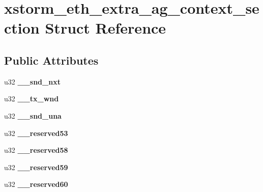 \hypertarget{structxstorm__eth__extra__ag__context__section}{
\section{xstorm\_\-eth\_\-extra\_\-ag\_\-context\_\-section Struct Reference}
\label{structxstorm__eth__extra__ag__context__section}
}
\subsection*{Public Attributes}
\begin{DoxyCompactItemize}
\item 
\hypertarget{structxstorm__eth__extra__ag__context__section_a23758415856c4a96114fd54cebeb6c03}{
u32 {\bfseries \_\-\_\-snd\_\-nxt}}
\label{structxstorm__eth__extra__ag__context__section_a23758415856c4a96114fd54cebeb6c03}

\item 
\hypertarget{structxstorm__eth__extra__ag__context__section_aa446dbf85c3e9340d5f7b6c2d716c24f}{
u32 {\bfseries \_\-\_\-tx\_\-wnd}}
\label{structxstorm__eth__extra__ag__context__section_aa446dbf85c3e9340d5f7b6c2d716c24f}

\item 
\hypertarget{structxstorm__eth__extra__ag__context__section_adbbbc039cc002cc3d3acb4dc955a78ce}{
u32 {\bfseries \_\-\_\-snd\_\-una}}
\label{structxstorm__eth__extra__ag__context__section_adbbbc039cc002cc3d3acb4dc955a78ce}

\item 
\hypertarget{structxstorm__eth__extra__ag__context__section_a65ef1bcdd3724f50ceaceab361eca348}{
u32 {\bfseries \_\-\_\-reserved53}}
\label{structxstorm__eth__extra__ag__context__section_a65ef1bcdd3724f50ceaceab361eca348}

\item 
\hypertarget{structxstorm__eth__extra__ag__context__section_a78b940c45897fa0a3355163c11149128}{
u32 {\bfseries \_\-\_\-reserved58}}
\label{structxstorm__eth__extra__ag__context__section_a78b940c45897fa0a3355163c11149128}

\item 
\hypertarget{structxstorm__eth__extra__ag__context__section_aa07fb0a5cfcbd137ee4cff09fc7321d8}{
u32 {\bfseries \_\-\_\-reserved59}}
\label{structxstorm__eth__extra__ag__context__section_aa07fb0a5cfcbd137ee4cff09fc7321d8}

\item 
\hypertarget{structxstorm__eth__extra__ag__context__section_a5192ed3f3d7a5824863fb9a42fdd1f61}{
u32 {\bfseries \_\-\_\-reserved60}}
\label{structxstorm__eth__extra__ag__context__section_a5192ed3f3d7a5824863fb9a42fdd1f61}


\end{DoxyCompactItemize}
